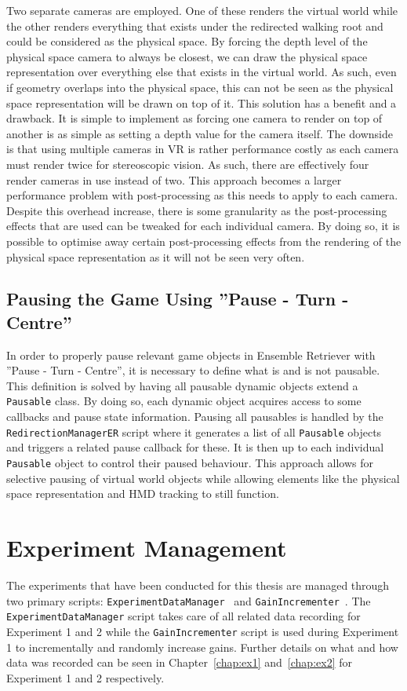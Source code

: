 Two separate cameras are employed. One of these renders the virtual world while the other renders everything that exists under the redirected walking root and could be considered as the physical space. By forcing the depth level of the physical space camera to always be closest, we can draw the physical space representation over everything else that exists in the virtual world. As such, even if geometry overlaps into the physical space, this can not be seen as the physical space representation will be drawn on top of it. This solution has a benefit and a drawback. It is simple to implement as forcing one camera to render on top of another is as simple as setting a depth value for the camera itself. The downside is that using multiple cameras in VR is rather performance costly as each camera must render twice for stereoscopic vision. As such, there are effectively four render cameras in use instead of two. This approach becomes a larger performance problem with post-processing as this needs to apply to each camera. Despite this overhead increase, there is some granularity as the post-processing effects that are used can be tweaked for each individual camera. By doing so, it is possible to optimise away certain post-processing effects from the rendering of the physical space representation as it will not be seen very often. 

\subsection{Pausing the Game Using ''Pause - Turn - Centre''}
In order to properly pause relevant game objects in Ensemble Retriever with ''Pause - Turn - Centre'', it is necessary to define what is and is not pausable. This definition is solved by having all pausable dynamic objects extend a \lstinline{Pausable} class. By doing so, each dynamic object acquires access to some callbacks and pause state information. Pausing all pausables is handled by the \lstinline{RedirectionManagerER} script where it generates a list of all \lstinline{Pausable} objects and triggers a related pause callback for these. It is then up to each individual \lstinline{Pausable} object to control their paused behaviour. This approach allows for selective pausing of virtual world objects while allowing elements like the physical space representation and HMD tracking to still function. 
 
\section{Experiment Management}
The experiments that have been conducted for this thesis are managed through two primary scripts: \lstinline{ExperimentDataManager}~\cite{experimentDataManager} and \lstinline{GainIncrementer}~\cite{gainIncrementer}. The \lstinline{ExperimentDataManager} script takes care of all related data recording for Experiment 1 and 2 while the \lstinline{GainIncrementer} script is used during Experiment 1 to incrementally and randomly increase gains. Further details on what and how data was recorded can be seen in Chapter~\ref{chap:ex1} and~\ref{chap:ex2} for Experiment 1 and 2 respectively. 


